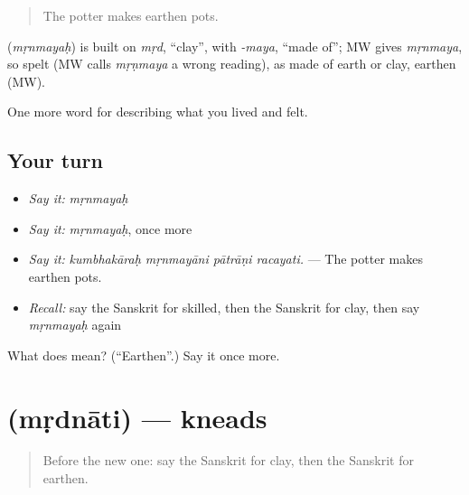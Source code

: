 \begin{quote}
The potter makes earthen pots.
\end{quote}

\begin{cousinweb}
\textbf{} (\emph{mṛnmayaḥ}) is built on \emph{mṛd}, \textquotedblleft{}clay\textquotedblright{}, with \emph{-maya}, \textquotedblleft{}made of\textquotedblright{}; MW gives \emph{mṛnmaya}, so spelt (MW calls \emph{mṛṇmaya} a wrong reading), as made of earth or clay, earthen (MW).
\end{cousinweb}

\begin{grammarlens}[title={What you've built}]
One more word for describing what you lived and felt.
\end{grammarlens}

\subsection*{Your turn}
\begin{itemize}
\raggedright
  \item \emph{Say it:} \emph{mṛnmayaḥ}
  \item \emph{Say it:} \emph{mṛnmayaḥ}, once more
  \item \emph{Say it:} \emph{kumbhakāraḥ mṛnmayāni pātrāṇi racayati.} — The potter makes earthen pots.
  \item \emph{Recall:} say the Sanskrit for skilled, then the Sanskrit for clay, then say \emph{mṛnmayaḥ} again
\end{itemize}

\begin{tcolorbox}[breakable,colback=teal!4,colframe=teal!35!black,title={Before you move on}]
What does  mean? (\textquotedblleft{}Earthen\textquotedblright{}.) Say it once more.
\end{tcolorbox}
\section[\texorpdfstring{\sk{मृद्नाति} (mṛdnāti)}{मृद्नाति (mṛdnāti)}]{ (mṛdnāti) — kneads}

\label{lesson:SA-C505-mrdnati}



\begin{quote}
Before the new one: say the Sanskrit for clay, then the Sanskrit for earthen.
\end{quote}

